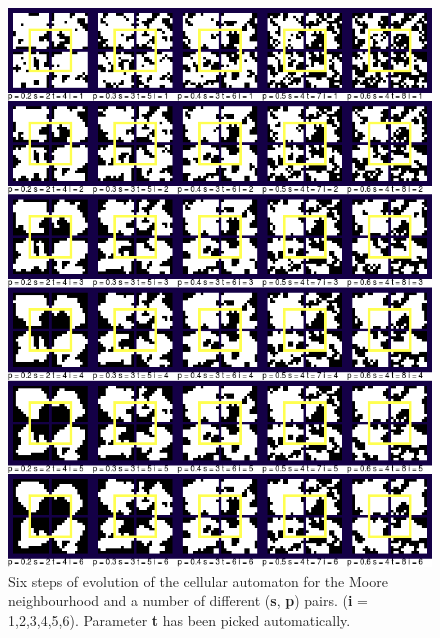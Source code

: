 \documentclass[a4paper, 11pt]{article} %
\begin{document}
\begin{figure}[ht]
	\centering
	\includegraphics[width=1.\textwidth]{moore_i}
	\caption{Six steps of evolution of the cellular automaton for the Moore neighbourhood and a number of different (\textbf{s}, \textbf{p}) pairs. (\textbf{i} = 1,2,3,4,5,6). Parameter \textbf{t} has been picked automatically.}
	\label{fig:results1}
\end{figure}
\end{document}
